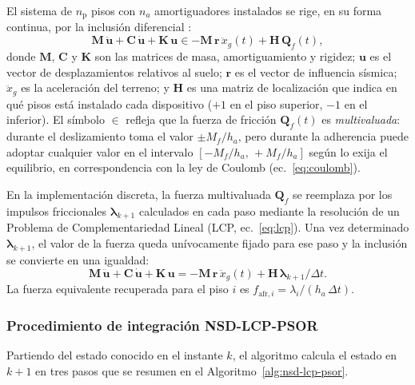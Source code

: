\documentclass[preprint,12pt,authoryear]{elsarticle}
\newcommand{\np}{n_{\mathrm{p}}}              %
\newcommand{\Mf}{M_{\!f}}
\newcommand{\ha}{h_a}
\begin{document}
El sistema de $\np$ pisos con $n_a$ amortiguadores instalados se rige, en su
forma continua, por la inclusión diferencial \citep{Namorado2024}:
\begin{equation}
    \bm{M}\,\ddot{\bm{u}} + \bm{C}\,\dot{\bm{u}} + \bm{K}\,\bm{u}
    \in -\bm{M}\,\bm{r}\,\ddot{x}_g(t) + \bm{H}\,\bm{Q}_f(t),
    \label{eq:eom}
\end{equation}
donde $\bm{M}$, $\bm{C}$ y $\bm{K}$ son las matrices de masa, amortiguamiento
y rigidez; $\bm{u}$ es el vector de desplazamientos relativos al suelo;
$\bm{r}$ es el vector de influencia sísmica; $\ddot{x}_g$ es la aceleración
del terreno; y $\bm{H}$ es una matriz de localización que indica en qué pisos
está instalado cada dispositivo ($+1$ en el piso superior, $-1$ en el inferior).
El símbolo $\in$ refleja que la fuerza de fricción $\bm{Q}_f(t)$ es
\textit{multivaluada}: durante el deslizamiento toma el valor $\pm\Mf/\ha$,
pero durante la adherencia puede adoptar cualquier valor en el intervalo
$[-\Mf/\ha,\,+\Mf/\ha]$ según lo exija el equilibrio, en correspondencia con
la ley de Coulomb (ec.~\ref{eq:coulomb}).

En la implementación discreta, la fuerza multivaluada $\bm{Q}_f$ se reemplaza
por los impulsos friccionales $\bm{\lambda}_{k+1}$ calculados en cada paso
mediante la resolución de un Problema de Complementariedad Lineal
(LCP, ec.~\ref{eq:lcp}). Una vez determinado
$\bm{\lambda}_{k+1}$, el valor de la fuerza queda unívocamente fijado para ese
paso y la inclusión se convierte en una igualdad:
\begin{equation}
    \bm{M}\,\ddot{\bm{u}} + \bm{C}\,\dot{\bm{u}} + \bm{K}\,\bm{u}
    = -\bm{M}\,\bm{r}\,\ddot{x}_g(t) + \bm{H}\,\bm{\lambda}_{k+1}/\Delta t.
    \label{eq:eom_disc}
\end{equation}
La fuerza equivalente recuperada para el piso $i$ es
$f_{\mathrm{afr},i} = \lambda_i / (\ha\,\Delta t)$.

\subsubsection*{Procedimiento de integración NSD-LCP-PSOR}

Partiendo del estado conocido en el instante $k$, el algoritmo calcula el
estado en $k+1$ en tres pasos que se resumen en el
Algoritmo~\ref{alg:nsd-lcp-psor}.
\end{document}
